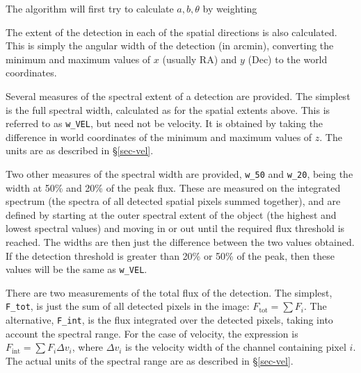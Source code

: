 The algorithm will first try to calculate $a,b,\theta$ by weighting



The extent of the detection in each of the spatial directions is also
calculated. This is simply the angular width of the detection (in
arcmin), converting the minimum and maximum values of $x$ (usually RA)
and $y$ (Dec) to the world coordinates.


Several measures of the spectral extent of a detection are
provided. The simplest is the full spectral width, calculated as for
the spatial extents above. This is referred to as \texttt{w\_VEL}, but
need not be velocity. It is obtained by taking the difference in world
coordinates of the minimum and maximum values of $z$. The units are as
described in \S\ref{sec-vel}.

Two other measures of the spectral width are provided, \texttt{w\_50}
and \texttt{w\_20}, being the width at 50\% and 20\% of the peak
flux. These are measured on the integrated spectrum (\ie the spectra
of all detected spatial pixels summed together), and are defined by
starting at the outer spectral extent of the object (the highest and
lowest spectral values) and moving in or out until the required flux
threshold is reached. The widths are then just the difference between
the two values obtained. If the detection threshold is greater than
20\% or 50\% of the peak, then these values will be the same as
\texttt{w\_VEL}.



There are two measurements of the total flux of the detection. The
simplest, \texttt{F\_tot}, is just the sum of all detected pixels in
the image: $F_\text{tot}=\sum F_i$. The alternative, \texttt{F\_int},
is the flux integrated over the detected pixels, taking into account
the spectral range. For the case of velocity, the expression is
$F_\text{int} = \sum F_i \Delta v_i$, where $\Delta v_i$ is the
velocity width of the channel containing pixel $i$. The actual units
of the spectral range are as described in \S\ref{sec-vel}.

